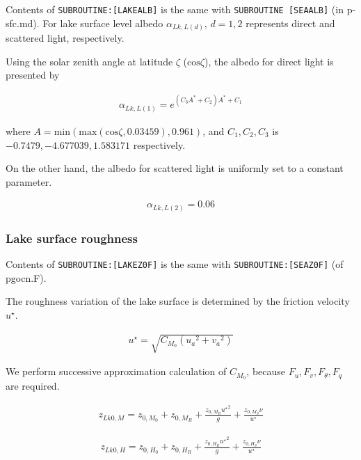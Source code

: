 Contents of \texttt{SUBROUTINE:{[}LAKEALB{]}} is the same with
\texttt{SUBROUTINE\ {[}SEAALB{]}} (in p-sfc.md). For lake surface level
albedo \(\alpha_{Lk,L(d)}\), \(d=1,2\) represents direct and scattered
light, respectively.

Using the solar zenith angle at latitude \(\zeta\)
(\(\mathrm{cos}\zeta\)), the albedo for direct light is presented by

\begin{eqnarray}
    \alpha_{Lk,L(1)} = e^{(C_3A^* + C_2) A^* +C_1}
\end{eqnarray}

where
\(A = \mathrm{min}(\mathrm{max}(\mathrm{cos}\zeta,0.03459),0.961)\), and
\(C_1, C_2, C_3\) is \(-0.7479, -4.677039, 1.583171\) respectively.

On the other hand, the albedo for scattered light is uniformly set to a
constant parameter.

\begin{eqnarray}
    \alpha_{Lk,L(2)} = 0.06
\end{eqnarray}

\hypertarget{lake-surface-roughness}{%
\subsubsection{Lake surface roughness}\label{lake-surface-roughness}}

Contents of \texttt{SUBROUTINE:{[}LAKEZ0F{]}} is the same with
\texttt{SUBROUTINE:{[}SEAZ0F{]}} (of pgocn.F).

The roughness variation of the lake surface is determined by the
friction velocity \(u^\star\).

\begin{eqnarray}
u^{\star} = \sqrt{C_{M_0} ({u_a}^2  +{v_a}^2)}
\end{eqnarray}

We perform successive approximation calculation of \({C_{M_0}}\),
because \(F_u,F_v,F_\theta,F_q\) are required.

\begin{eqnarray}
    z_{Lk0,M} = z_{0,M_0} + z_{0,M_R} + \frac{z_{0,M_R} {u^\star }^2 }{g} + \frac{z_{0,M_S}\nu }{u^\star}
\end{eqnarray}

\begin{eqnarray}
    z_{Lk0,H} = z_{0,H_0} + z_{0,H_R} + \frac{z_{0,H_R} {u^\star }^2 }{g} + \frac{z_{0,H_S}\nu }{u^\star}
\end{eqnarray}

